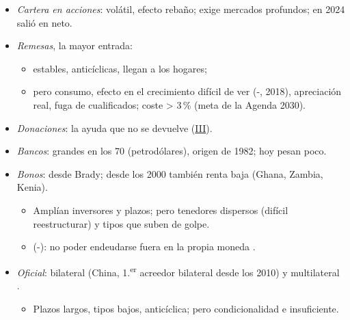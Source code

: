 \documentclass{article}
\begin{document}
\begin{columnas}
\begin{itemize}
\begin{itemize}
  \item la más estable; tecnología, gestión, mercados; sus rentas caen en las malas épocas;
  \item por qué: ventajas OLI (, 1980); solo las más productivas (--, 2004);
  \item contras: pocos países de renta media; en los pobres, recursos naturales; repatría beneficios.
  \end{itemize}
\item \emph{Cartera en acciones}: volátil, efecto rebaño; exige mercados profundos; en 2024 salió en neto.
\item \emph{Remesas}, la mayor entrada:
  \begin{itemize}
  \item estables, anticíclicas, llegan a los hogares;
  \item pero consumo, efecto en el crecimiento difícil de ver (-, 2018), apreciación real, fuga de cualificados; coste > 3\,\% (meta de la Agenda 2030).
  \end{itemize}
\item \emph{Donaciones}: la ayuda que no se devuelve (\hyperref[rep:III]{III}).
\end{itemize}
\begin{itemize}
\item \emph{Bancos}: grandes en los 70 (petrodólares), origen de 1982; hoy pesan poco.
\item \emph{Bonos}: desde Brady; desde los 2000 también renta baja (Ghana, Zambia, Kenia).
  \begin{itemize}
  \item Amplían inversores y plazos; pero tenedores dispersos (difícil reestructurar) y tipos que suben de golpe.
  \item {} (-): no poder endeudarse fuera en la propia moneda .
  \end{itemize}
\item \emph{Oficial}: bilateral (China, 1.\textsuperscript{er} acreedor bilateral desde los 2010) y multilateral  .
  \begin{itemize}
  \item Plazos largos, tipos bajos, anticíclica; pero condicionalidad e insuficiente.
  \end{itemize}
\end{itemize}

\end{columnas}
\end{document}
